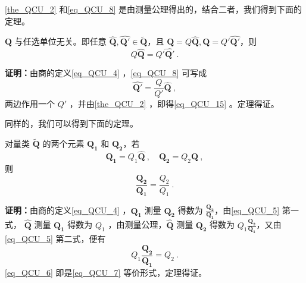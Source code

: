 \autoref{the_QCU_2} 和\autoref{eq_QCU_8} 是由测量公理得出的，结合二者，我们得到下面的定理。
\begin{theorem}{}\label{the_QCU_3}
$\boldsymbol{Q}$ 与任选单位无关。即任意 $\hat{\boldsymbol{Q}},\hat{\boldsymbol{Q'}}\in\tilde{\boldsymbol{Q}}$，且 $\boldsymbol{Q}=Q\hat{\boldsymbol{Q}},\boldsymbol{Q}=Q'\hat{\boldsymbol{Q'}}$，则
\begin{equation}\label{eq_QCU_15}
Q\hat{\boldsymbol{Q}}=Q'\hat{\boldsymbol{Q'}}~.
\end{equation}
\end{theorem}
\textbf{证明：}由商的定义\autoref{eq_QCU_4} ，\autoref{eq_QCU_8} 可写成
\begin{equation}
\hat{\boldsymbol{Q'}}=\frac{Q}{Q'}\hat{\boldsymbol{Q}}~,
\end{equation}
两边作用一个 $Q'$ ，并由\autoref{the_QCU_2} ，即得\autoref{eq_QCU_15} 。定理得证。

同样的，我们可以得到下面的定理。
\begin{theorem}{}\label{the_QCU_1}
对量类 $\tilde{\boldsymbol{Q}}$ 的两个元素 $\boldsymbol{Q_1}$ 和 $\boldsymbol{Q_2}$，若
\begin{equation}\label{eq_QCU_5}
\boldsymbol{Q_1}=Q_1\hat{\boldsymbol{Q}}~,\quad \boldsymbol{Q_2}=Q_2\hat{\boldsymbol{Q}}~,
\end{equation}
则
\begin{equation}\label{eq_QCU_7}
\frac{\boldsymbol{Q_2}}{\boldsymbol{Q_1}}=\frac{Q_2}{Q_1}~.
\end{equation}
\end{theorem}
\textbf{证明：}由商的定义\autoref{eq_QCU_4} ，$\boldsymbol{Q_1}$ 测量 $\boldsymbol{Q_2}$ 得数为 $\frac{\boldsymbol{Q_2}}{\boldsymbol{Q_1}}$，由\autoref{eq_QCU_5} 第一式， $\hat{\boldsymbol{Q}}$ 测量 $\boldsymbol{Q_1}$ 得数为 $Q_1$ ，由测量公理，$\hat{\boldsymbol{Q}}$ 测量 $\boldsymbol{Q_2}$ 得数为 $Q_1\frac{\boldsymbol{Q_2}}{\boldsymbol{Q_1}}$，又由\autoref{eq_QCU_5} 第二式，便有
\begin{equation}\label{eq_QCU_6}
Q_1\frac{\boldsymbol{Q_2}}{\boldsymbol{Q_1}}=Q_2~.
\end{equation}
\autoref{eq_QCU_6} 即是\autoref{eq_QCU_7} 等价形式，定理得证。

